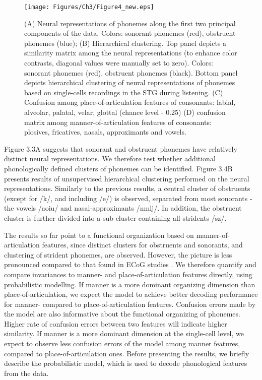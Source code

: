 \begin{figure}[h]
\vspace{.3in}
\texttt{[image: Figures/Ch3/Figure4\_new.eps]}
\caption{(A) Neural representations of phonemes along the first two principal components of the data. Colors: sonorant phonemes (red), obstruent phonemes (blue); (B) Hierarchical clustering. Top panel depicts a similarity matrix among the neural representations (to enhance color contrasts, diagonal values were manually set to zero). Colors: sonorant phonemes (red), obstruent phonemes (black). Bottom panel depicts hierarchical clustering of neural representations of phonemes based on single-cells recordings in the STG during listening. (C) Confusion among place-of-articulation features of consonants: labial, alveolar, palatal, velar, glottal (chance level - 0.25) (D) confusion matrix among manner-of-articulation features of consonants: plosives, fricatives, nasals, approximants and vowels.}
\end{figure}

Figure 3.3A suggests that sonorant and obstruent phonemes have relatively distinct neural representations. We therefore test whether additional phonologically defined clusters of phonemes can be identified. Figure 3.4B presents results of unsupervised hierarchical clustering performed on the neural representations. Similarly to the previous results, a central cluster of obstruents (except for /k/, and including /e/) is observed, separated from most sonorants - the vowels /aoiu/ and nasal-approximants /nmlj/. In addition, the obstruent cluster is further divided into a sub-cluster containing all stridents /sz/. 

The results so far point to a functional organization based on manner-of-articulation features, since distinct clusters for obstruents and sonorants, and clustering of strident phonemes, are observed. However, the picture is less pronounced compared to that found in ECoG studies \citep{Mesgarani2014}. We therefore quantify and compare invariances to manner- and place-of-articulation features directly, using probabilistic modelling. If manner is a more dominant organizing dimension than place-of-articulation, we expect the model to achieve better decoding performance for manner- compared to place-of-articulation features. Confusion errors made by the model are also informative about the functional organizing of phonemes. Higher rate of confusion errors between two features will indicate higher similarity. If manner is a more dominant dimension at the single-cell level, we expect to observe less confusion errors of the model among manner features, compared to place-of-articulation ones. Before presenting the results, we briefly describe the probabilistic model, which is used to decode phonological features from the data.

